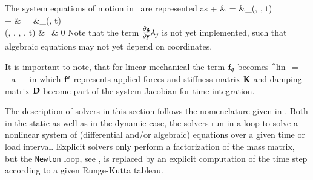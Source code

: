 \begin{center}
\begin{longtable}{| p{5cm} | p{5cm} | p{6cm} |}
	  \end{longtable}
	\end{center}

The system equations of motion in \codeName\ are represented as 
\bea \label{eq_system_EOM}
  \Mm \ddot \qv +  \tlambda & = &\fv_\SO(\qv, \dot \qv, t) \\
  \dot \yv +  \tlambda & = &\fv_\FO(\yv, t) \\
	\gv(\qv, \dot \qv, \yv, \tlambda, t) &=& 0
\eea
Note that the term $\frac{\partial \mathbf{g}}{\partial \mathbf{y}} \mbox{\boldmath $\lambda$ \unboldmath}\!\!_y$ is not yet implemented, such that algebraic equations may not yet depend on \FON coordinates.

It is important to note, that for linear mechanical the term $\mathbf{f}_q$ becomes
\be
  \fv^{lin}_\SO = \fv_a - \Km \qv - \Dm \dot \qv
\ee
in which $\mathbf{f}^a$ represents applied forces and stiffness matrix $\mathbf{K}$ and damping matrix $\mathbf{D}$ become part of the system Jacobian for time integration.





\label{sec:solvers}
The description of solvers in this section follows the nomenclature given in .
Both in the static as well as in the dynamic case, the solvers run in a loop to solve a nonlinear system of (differential and/or algebraic) equations over a given time or load interval. Explicit solvers only perform a factorization of the mass matrix, but the \texttt{Newton} loop, see , is replaced by an explicit computation of the time step according to a given Runge-Kutta tableau.

